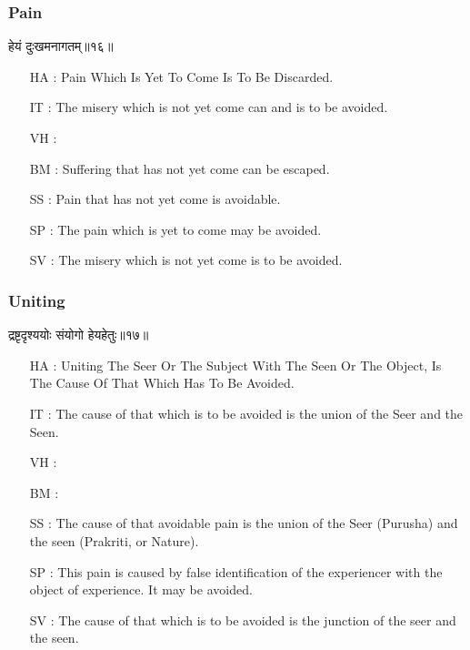 \begin{frame}[fragile]\frametitle{Pain}
\begin{sanskrit}
हेयं दुःखमनागतम्॥१६॥
\end{sanskrit}

	\begin{itemize}
	\item [HA]: Pain Which Is Yet To Come Is To Be Discarded.
	\item [IT]: The misery which is not yet come can and is to be avoided.
	\item [VH]: 
	\item [BM]: Suffering that has not yet come can be escaped.
	\item [SS]: Pain that has not yet come is avoidable.
	\item [SP]: The pain which is yet to come may be avoided.
	\item [SV]: The misery which is not yet come is to be avoided. 
	\end{itemize}
\end{frame}


\begin{frame}[fragile]\frametitle{Uniting}
\begin{sanskrit}
द्रष्टृदृश्ययोः संयोगो हेयहेतुः॥१७॥
\end{sanskrit}

	\begin{itemize}
	\item [HA]: Uniting The Seer Or The Subject With The Seen Or The Object, Is The Cause Of That Which Has To Be Avoided.
	\item [IT]: The cause of that which is to be avoided is the union of the Seer and the Seen.
	\item [VH]: 
	\item [BM]: 
	\item [SS]: The cause of that avoidable pain is the union of the Seer (Purusha) and the seen (Prakriti, or Nature).
	\item [SP]: This pain is caused by false identification of the experiencer with the object of experience. It may be avoided.
	\item [SV]: The cause of that which is to be avoided is the junction of the seer and the seen. 
	\end{itemize}
\end{frame}

